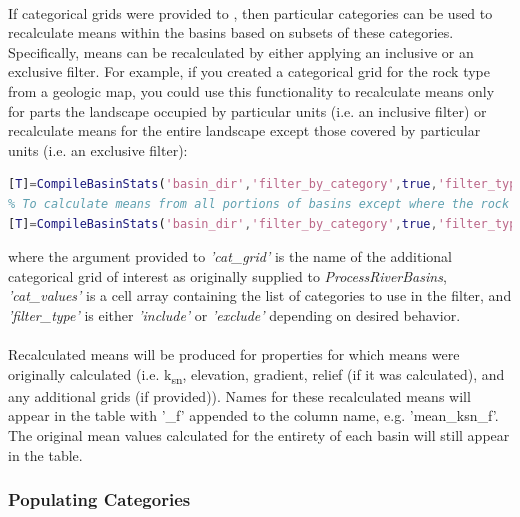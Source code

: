 \paragraph{}If categorical grids were provided to , then particular categories can be used to recalculate means within the basins based on subsets of these categories. Specifically, means can be recalculated by either applying an inclusive or an exclusive filter. For example, if you created a categorical grid for the rock type from a geologic map, you could use this functionality to recalculate means only for parts the landscape occupied by particular units (i.e. an inclusive filter) or recalculate means for the entire landscape except those covered by particular units (i.e. an exclusive filter):

\begin{lstlisting}[language=Matlab]
% To calculate means only from portions of a basin defined by certain rock types
[T]=CompileBasinStats('basin_dir','filter_by_category',true,'filter_type','include','cat_grid','geology','cat_values',{'pCc','grMz','pC','gr-m','Pc','grPz','grpC','gr'});
% To calculate means from all portions of basins except where the rock types are certain types
[T]=CompileBasinStats('basin_dir','filter_by_category',true,'filter_type','exclude','cat_grid','geology','cat_values',{'Q','Qpc','Qg','Qls','Qs','Qv','water','undef'});
\end{lstlisting}

\noindent
where the argument provided to \textit{'cat\_grid'} is the name of the additional categorical grid of interest as originally supplied to \textit{ProcessRiverBasins}, \textit{'cat\_values'} is a cell array containing the list of categories to use in the filter, and \textit{'filter\_type'} is either \textit{'include'} or \textit{'exclude'} depending on desired behavior.

\paragraph{}Recalculated means will be produced for properties for which means were originally calculated (i.e. k\textsubscript{sn}, elevation, gradient, relief (if it was calculated), and any additional grids (if provided)). Names for these recalculated means will appear in the table with '\_f' appended to the column name, e.g. 'mean\_ksn\_f'. The original mean values calculated for the entirety of each basin will still appear in the table.

\subsubsection{Populating Categories}
